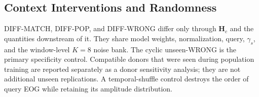 \subsection{Context Interventions and Randomness}
DIFF-MATCH, DIFF-POP, and DIFF-WRONG differ only through $\mathbf H_c$ and the
quantities downstream of it. They share model weights, normalization, query,
$\gamma_s$, and the window-level $K=8$ noise bank. The cyclic unseen-WRONG is
the primary specificity control. Compatible donors that were seen during
population training are reported separately as a donor sensitivity analysis;
they are not additional unseen replications. A temporal-shuffle control destroys
the order of query EOG while retaining its amplitude distribution.


